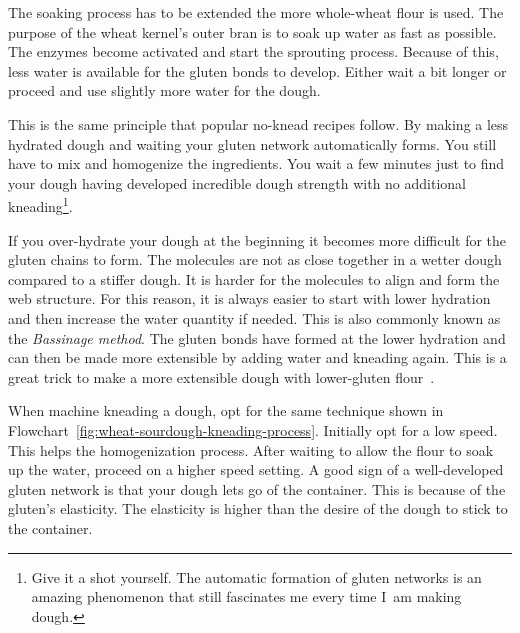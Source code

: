 The soaking process has to be extended the more whole-wheat flour is used.
The purpose of the wheat kernel's outer bran is to soak up water as fast
as possible. The enzymes become activated and start the sprouting process.
Because of this, less water is available for the gluten bonds to develop.
Either wait a bit longer or proceed and use slightly more water for
the dough.

This is the same principle that popular no-knead recipes follow. By making a less
hydrated dough and waiting your gluten network automatically forms. You still
have to mix and homogenize the ingredients. You wait a few minutes just to
find your dough having developed incredible dough strength with no additional
kneading\footnote{Give it a shot yourself. The automatic formation of gluten
networks is an amazing phenomenon that still fascinates me every time I~am
making dough.}.

If you over-hydrate your dough at the beginning it becomes more difficult
for the gluten chains to form. The molecules are not as close together in
a wetter dough compared to a stiffer dough. It is harder for the molecules
to align and form the web structure. For this reason, it is always easier
to start with lower hydration and then increase the water quantity if needed.
This is also commonly known as the \emph{Bassinage method}. The gluten
bonds have formed at the lower hydration and can then be made more extensible
by adding water and kneading again. This is a great trick to make
a more extensible dough with lower-gluten flour~\cite{bassinage+technique}.

When machine kneading a dough, opt for the same technique shown in
Flowchart~\ref{fig:wheat-sourdough-kneading-process}.  Initially opt for a low
speed. This helps the homogenization process.
After waiting to allow the flour to soak up the water, proceed on a higher speed
setting. A good sign of a well-developed gluten network is
that your dough lets go of the container. This is because of the gluten's elasticity.
The elasticity is higher than the desire of the
dough to stick to the container.

